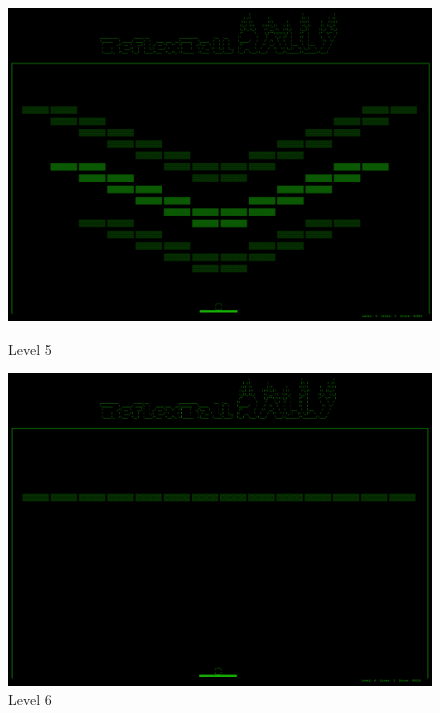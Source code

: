 \begin{figure}[ht]
\begin{minipage}[b]{0.5\linewidth}
\centering
\includegraphics[scale=0.12]{figs/screenshots/level5.png}
\caption{Level 5}
\label{fig:level5}
\end{minipage}
\hspace{0.5cm}
\begin{minipage}[b]{0.5\linewidth}
\centering
\includegraphics[scale=0.12]{figs/screenshots/level6.png}
\caption{Level 6}
\label{fig:level6}
\end{minipage}
\end{figure}